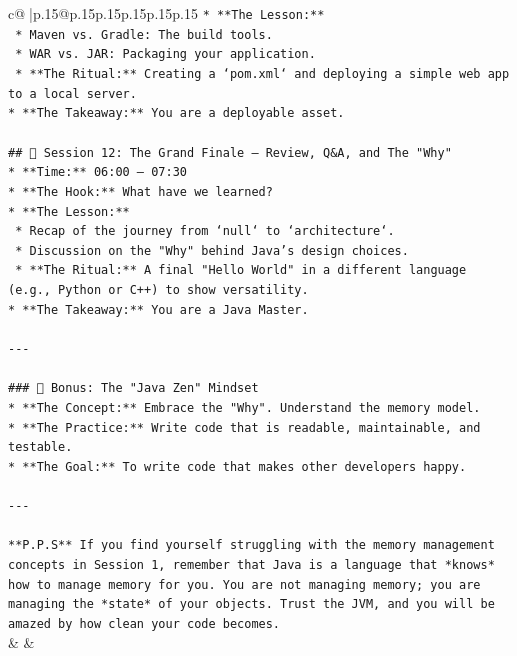 \documentclass{article}
\begin{document}
{\begin{supertabular}{c@{$\;$}|p{.15\linewidth}@{}p{.15\linewidth}p{.15\linewidth}p{.15\linewidth}p{.15\linewidth}p{.15\linewidth}}
{{{\texttt{*   **The Lesson:**} \\
\texttt{    *   Maven vs. Gradle: The build tools.} \\
\texttt{    *   WAR vs. JAR: Packaging your application.} \\
\texttt{    *   **The Ritual:** Creating a `pom.xml` and deploying a simple web app to a local server.} \\
\texttt{*   **The Takeaway:** You are a deployable asset.} \\
\\ 
\texttt{\#\# 📅 Session 12: The Grand Finale – Review, Q\&A, and The "Why"} \\
\texttt{*   **Time:** 06:00 – 07:30} \\
\texttt{*   **The Hook:** What have we learned?} \\
\texttt{*   **The Lesson:**} \\
\texttt{    *   Recap of the journey from `null` to `architecture`.} \\
\texttt{    *   Discussion on the "Why" behind Java's design choices.} \\
\texttt{    *   **The Ritual:** A final "Hello World" in a different language (e.g., Python or C++) to show versatility.} \\
\texttt{*   **The Takeaway:** You are a Java Master.} \\
\\ 
\texttt{{-}{-}{-}} \\
\\ 
\texttt{\#\#\# 🎁 Bonus: The "Java Zen" Mindset} \\
\texttt{*   **The Concept:** Embrace the "Why". Understand the memory model.} \\
\texttt{*   **The Practice:** Write code that is readable, maintainable, and testable.} \\
\texttt{*   **The Goal:** To write code that makes other developers happy.} \\
\\ 
\texttt{{-}{-}{-}} \\
\\ 
\texttt{**P.P.S** If you find yourself struggling with the memory management concepts in Session 1, remember that Java is a language that *knows* how to manage memory for you. You are not managing memory; you are managing the *state* of your objects. Trust the JVM, and you will be amazed by how clean your code becomes.} \\
            }
        }
    }
    & & \\ \\


\end{supertabular}}
\end{document}
